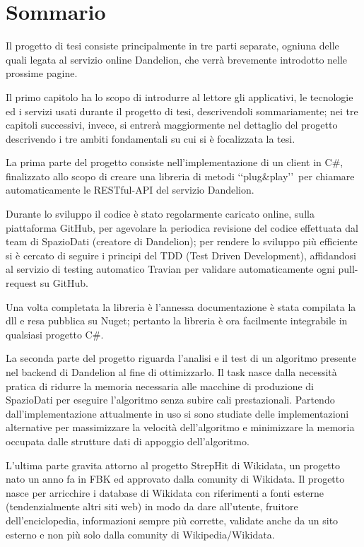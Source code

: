 \chapter*{Sommario} %
\label{sommario}


Il progetto di tesi consiste principalmente in tre parti separate, ogniuna delle quali legata al servizio online Dandelion, che verrà brevemente introdotto nelle prossime pagine. 

Il primo capitolo ha lo scopo di introdurre al lettore gli applicativi, le tecnologie ed i servizi usati durante il progetto di tesi, descrivendoli sommariamente; 
nei tre capitoli successivi, invece, si entrerà maggiormente nel dettaglio del progetto descrivendo i tre ambiti fondamentali su cui si è focalizzata la tesi.

La prima parte del progetto consiste nell'implementazione di un client in C$\#$, finalizzato allo scopo di creare una libreria di metodi \lq\lq plug$\&$play\rq\rq\ 
per chiamare automaticamente le RESTful-API del servizio Dandelion. 

Durante lo sviluppo il codice è stato regolarmente caricato online, sulla piattaforma GitHub, per agevolare la periodica revisione del codice effettuata dal team di SpazioDati (creatore di Dandelion); 
per rendere lo sviluppo più efficiente si è cercato di seguire i principi del TDD (Test Driven Development), affidandosi al servizio di testing automatico Travian 
per validare automaticamente ogni pull-request su GitHub. 

Una volta completata la libreria è l'annessa documentazione è stata compilata la dll e resa pubblica su Nuget; 
pertanto la libreria è ora facilmente integrabile in qualsiasi progetto C$\#$.

La seconda parte del progetto riguarda l'analisi e il test di un algoritmo presente nel backend di Dandelion al fine di ottimizzarlo. 
Il task nasce dalla necessità pratica di ridurre la memoria necessaria alle macchine di produzione di SpazioDati per eseguire l'algoritmo senza subire cali prestazionali.
Partendo dall'implementazione attualmente in uso si sono studiate delle implementazioni alternative per massimizzare la velocità dell'algoritmo e minimizzare 
la memoria occupata dalle strutture dati di appoggio dell'algoritmo. 

L'ultima parte gravita attorno al progetto StrepHit di Wikidata, un progetto nato un anno fa in FBK ed approvato dalla comunity di Wikidata. 
Il progetto nasce per arricchire i database di Wikidata con riferimenti a fonti esterne (tendenzialmente altri siti web) in modo da dare all'utente, fruitore dell'enciclopedia, informazioni sempre più corrette,
validate anche da un sito esterno e non più solo dalla comunity di Wikipedia/Wikidata.

